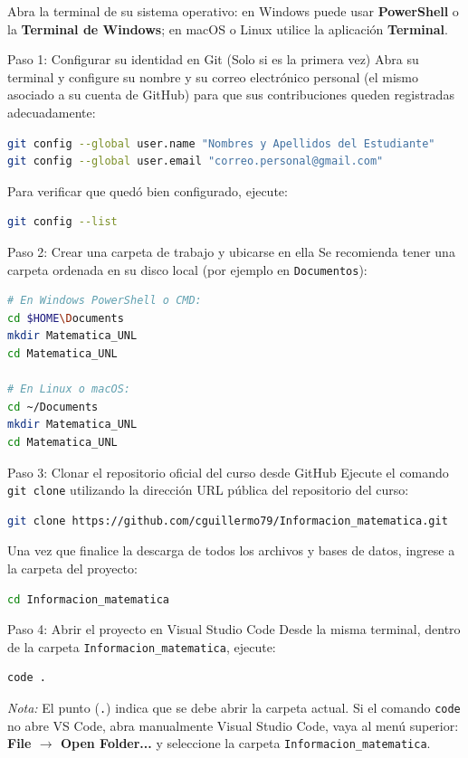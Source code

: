 \documentclass[11pt,a4paper]{article}
\begin{document}
Abra la terminal de su sistema operativo: en Windows puede usar \textbf{PowerShell} o la \textbf{Terminal de Windows}; en macOS o Linux utilice la aplicación \textbf{Terminal}.

\begin{stepbox}{Paso 1: Configurar su identidad en Git (Solo si es la primera vez)}
Abra su terminal y configure su nombre y su correo electrónico personal (el mismo asociado a su cuenta de GitHub) para que sus contribuciones queden registradas adecuadamente:
\begin{lstlisting}[language=bash]
git config --global user.name "Nombres y Apellidos del Estudiante"
git config --global user.email "correo.personal@gmail.com"
\end{lstlisting}
Para verificar que quedó bien configurado, ejecute:
\begin{lstlisting}[language=bash]
git config --list
\end{lstlisting}
\end{stepbox}

\begin{stepbox}{Paso 2: Crear una carpeta de trabajo y ubicarse en ella}
Se recomienda tener una carpeta ordenada en su disco local (por ejemplo en \texttt{Documentos}):
\begin{lstlisting}[language=bash]
# En Windows PowerShell o CMD:
cd $HOME\Documents
mkdir Matematica_UNL
cd Matematica_UNL

# En Linux o macOS:
cd ~/Documents
mkdir Matematica_UNL
cd Matematica_UNL
\end{lstlisting}
\end{stepbox}

\begin{stepbox}{Paso 3: Clonar el repositorio oficial del curso desde GitHub}
Ejecute el comando \texttt{git clone} utilizando la dirección URL pública del repositorio del curso:
\begin{lstlisting}[language=bash]
git clone https://github.com/cguillermo79/Informacion_matematica.git
\end{lstlisting}
Una vez que finalice la descarga de todos los archivos y bases de datos, ingrese a la carpeta del proyecto:
\begin{lstlisting}[language=bash]
cd Informacion_matematica
\end{lstlisting}
\end{stepbox}

\begin{stepbox}{Paso 4: Abrir el proyecto en Visual Studio Code}
Desde la misma terminal, dentro de la carpeta \texttt{Informacion\_matematica}, ejecute:
\begin{lstlisting}[language=bash]
code .
\end{lstlisting}
\textit{Nota:} El punto (\texttt{.}) indica que se debe abrir la carpeta actual. Si el comando \texttt{code} no abre VS Code, abra manualmente Visual Studio Code, vaya al menú superior: \textbf{File $\rightarrow$ Open Folder...} y seleccione la carpeta \texttt{Informacion\_matematica}.
\end{stepbox}
\end{document}
